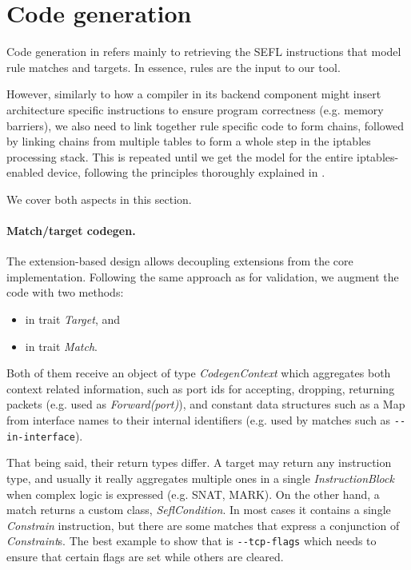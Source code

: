 {\section{Code generation}\label{sec:codegen}

Code generation in \TOOL refers mainly to retrieving the SEFL instructions that
model rule matches and targets.  In essence, rules are the input to our tool.

However, similarly to how a compiler in its backend component might insert
architecture specific instructions to ensure program correctness (e.g. memory
barriers), we also need to link together rule specific code to form chains,
followed by linking chains from multiple tables to form a whole step in the
iptables processing stack.  This is repeated until we get the model for the
entire iptables-enabled device, following the principles thoroughly explained
in .

We cover both aspects in this section.

\paragraph{Match/target codegen.}  The extension-based design allows decoupling
extensions from the core implementation.  Following the same approach as for
validation, we augment the code with two methods:
\begin{itemize}
  \item {} in trait
    \emph{Target}, and
  \item {} in trait
    \emph{Match}.
\end{itemize}

Both of them receive an object of type \emph{CodegenContext} which aggregates
both context related information, such as port ids for accepting, dropping,
returning packets (e.g. used as \emph{Forward(port)}), and constant data
structures such as a Map from interface names to their internal identifiers
(e.g. used by matches such as \lstinline{--in-interface}).

That being said, their return types differ. A target may return any instruction
type, and usually it really aggregates multiple ones in a single
\emph{InstructionBlock} when complex logic is expressed (e.g. SNAT, MARK). On
the other hand, a match returns a custom class, \emph{SeflCondition}.  In most
cases it contains a single \emph{Constrain} instruction, but there are some
matches that express a conjunction of \emph{Constraint}s.  The best example to
show that is \lstinline{--tcp-flags} which needs to ensure that certain flags
are set while others are cleared.

}
